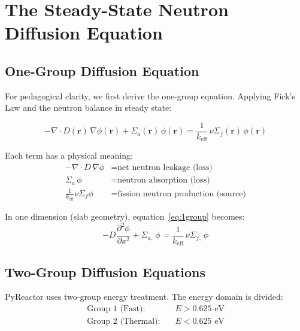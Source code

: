 \documentclass[12pt,a4paper]{article}
\newcommand{\keff}{k_{\mathrm{eff}}}
\newcommand{\siga}[1]{\Sigma_{a,#1}}
\newcommand{\sigf}[1]{\nu\Sigma_{f,#1}}
\newcommand{\diff}[1]{D_{#1}}
\newcommand{\flux}[1]{\phi_{#1}}
\newcommand{\pdd}[2]{\frac{\partial^2 #1}{\partial #2^2}}
\begin{document}
\section{The Steady-State Neutron Diffusion Equation}

\subsection{One-Group Diffusion Equation}

For pedagogical clarity, we first derive the one-group equation.
Applying Fick's Law and the neutron balance in steady state:

\begin{eqbox}
\begin{equation}
  -\nabla \cdot D(\mathbf{r})\,\nabla\phi(\mathbf{r})
  + \Sigma_a(\mathbf{r})\,\phi(\mathbf{r})
  = \frac{1}{\keff}\,\nu\Sigma_f(\mathbf{r})\,\phi(\mathbf{r})
  \label{eq:1group}
\end{equation}
\end{eqbox}

Each term has a physical meaning:
\begin{align*}
  -\nabla \cdot D\,\nabla\phi &= \text{net neutron leakage (loss)} \\
  \Sigma_a\,\phi              &= \text{neutron absorption (loss)} \\
  \frac{1}{\keff}\nu\Sigma_f\phi &= \text{fission neutron production (source)}
\end{align*}

In one dimension (slab geometry), equation~\eqref{eq:1group} becomes:
\begin{equation}
  -\diff{}\pdd{\flux{}}{x} + \siga{}\,\flux{}
  = \frac{1}{\keff}\,\sigf{}\,\flux{}
  \label{eq:1group_1d}
\end{equation}

\subsection{Two-Group Diffusion Equations}

PyReactor uses two-group energy treatment. The energy domain is divided:
\begin{align*}
  \text{Group 1 (Fast):}    &\quad E > 0.625 \text{ eV} \\
  \text{Group 2 (Thermal):} &\quad E < 0.625 \text{ eV}
\end{align*}
\end{document}
